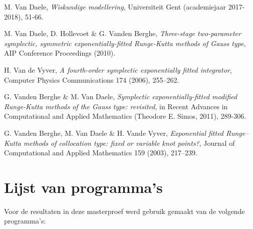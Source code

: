 \documentclass[12pt]{article}
\begin{document}
\begin{thebibliography}{9}
	M. Van Daele,
	\textit{Wiskundige modellering},
	Universiteit Gent (academiejaar 2017-2018), 51-66.
	
	M. Van Daele, D. Hollevoet \& G. Vanden Berghe,
	\textit{Three-stage two-parameter symplectic, symmetric exponentially-fitted Runge-Kutta methods of Gauss type},
	AIP Conference Proceedings (2010).
	
	H. Van de Vyver,
	\textit{A fourth-order symplectic exponentially fitted integrator},
	Computer Physics Communications 174 (2006), 255–262.
	
	G. Vanden Berghe \& M. Van Daele,
	\textit{Symplectic exponentially-fitted modified Runge-Kutta methods of the Gauss type: revisited},
	in Recent Advances in Computational and Applied Mathematics (Theodore E. Simos, 2011), 289-306.
	
	G. Vanden Berghe, M. Van Daele \& H. Vande Vyver,
	\textit{Exponential fitted Runge–Kutta methods of collocation type: fixed or variable knot points?},
	Journal of Computational and Applied Mathematics 159 (2003), 217–239.

\end{thebibliography}

\newpage
\section*{Lijst van programma's}
Voor de resultaten in deze masterproef werd gebruik gemaakt van de volgende programma's:
\end{document}
